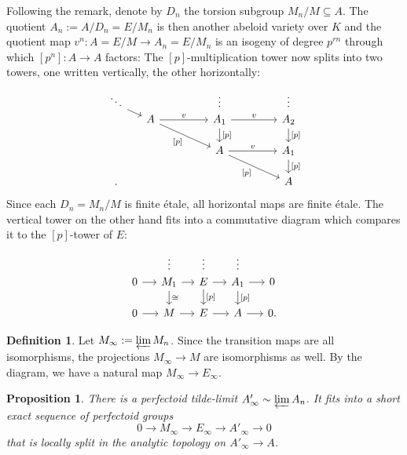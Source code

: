 \documentclass[10pt,oneside]{amsart}
\newtheorem{proposition}[theorem]{Proposition}
\theoremstyle{definition}
\newtheorem{definition}[theorem]{Definition}
\begin{document}
	Following the remark, denote by $D_n$ the torsion subgroup $M_n/M\subseteq A$. The quotient $A_n:=A/D_n = E/M_n$ is then another abeloid variety over $K$ and the quotient map $v^n:A=E/M\rightarrow A_n=E/M_n$ is an isogeny of degree $p^{rn}$  through which  $[p^n]:A\rightarrow A$ factors: The $[p]$-multiplication tower now splits into two towers, one written vertically, the other horizontally:
		\begin{equation}\label{p-multiplication tower of E/M splits into vertical and horizontal tower}
		\begin{tikzcd}[column sep={1.1cm,between origins},row sep={0.5cm,between origins}]
			\ddots \arrow[rd] &  &  & \vdots &  & \vdots \\
			& A \arrow[rr,"v"] \arrow[rrdd, "{[p]}"'] &  & A_1 \arrow[rr,"v"] \arrow[dd,"{[p]}"] &  & A_2 \arrow[dd,"{[p]}"] \\
			&  &  &  &  &  \\
			&  &  & A \arrow[rrdd, "{[p]}"'] \arrow[rr,"v"] &  & A_1 \arrow[dd,"{[p]}"] \\
			&  &  &  &  &  \\.
			&  &  &  &  & A
		\end{tikzcd}
		\end{equation}
		Since each $D_n=M_n/M$ is finite \'etale, all horizontal maps are finite \'etale. The vertical tower on the other hand fits into a commutative diagram which compares it to the $[p]$-tower of $E$:
		\begin{equation}\label{F-tower for E/M}
		\begin{tikzcd}[column sep={1.1cm,between origins},row sep={0.5cm,between origins}]
			&\vdots&\vdots&\vdots&\\
			0 \arrow[r] & M_1 \arrow[dd, "\cong"] \arrow[r] & E \arrow[dd, "{[p]}"] \arrow[r] & A_1 \arrow[dd, "{[p]}"] \arrow[r] & 0 \\
			\\
			0 \arrow[r] & M \arrow[r] & E \arrow[r] & A \arrow[r] & 0.
		\end{tikzcd}
		\end{equation}
		\begin{definition}
			Let $M_\infty:=\varprojlim M_n$. Since the transition maps are all isomorphisms, the projections $M_\infty\to M$ are isomorphisms as well. By the diagram, we have a natural map $M_\infty\to E_\infty$. 
		\end{definition}
		\begin{proposition}\label{M_infty->E_infty->A'_infty}
			There is a perfectoid tilde-limit $A'_\infty\sim \varprojlim A_n$. It fits into a short exact sequence of perfectoid groups 
			\[0\to M_\infty\to E_\infty\to A'_\infty\to 0 \]
			that is  locally split in the analytic topology on $A'_\infty\to A$.
		\end{proposition}
\end{document}
